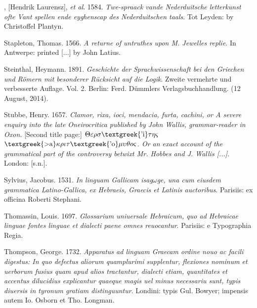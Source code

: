 \begin{styleStandard}
[Spieghel], [Hendrik Laurensz], \textit{et al}. 1584. \textit{Twe-spraack vande Nederduitsche letterkunst ofte Vant spellen ende eyghenscap des Nederduitschen taals}. Tot Leyden: by Christoffel Plantyn.
\end{styleStandard}

\begin{styleStandard}
Stapleton, Thomas. 1566. \textit{A returne of untruthes upon M. Jewelles replie}. In Antwerpe: printed [...] by John Latius.
\end{styleStandard}

\begin{styleStandard}
Steinthal, Heymann. 1891. \textit{Geschichte der Sprachwissenschaft bei den Griechen und Römern mit besonderer Rücksicht auf die Logik}. Zweite vermehrte und verbesserte Auflage. Vol. 2. Berlin: Ferd. Dümmlers Verlagsbuchhandlung. (12 August, 2014).
\end{styleStandard}

\begin{styleStandard}
Stubbe, Henry. 1657. \textit{Clamor, rixa, ioci, mendacia, furta, cachini, or A severe enquiry into the late Oneirocritica published by John Wallis, grammar-reader in Oxon. }[Second title page:]\textit{ $\Theta \varepsilon \rho \sigma \text{\textgreek{'i}}\tau \eta \varsigma $ $\text{\textgreek{>a}}\kappa \rho \iota \tau \text{\textgreek{'o}}\mu \upsilon \theta o\varsigma $. Or an exact account of the grammatical part of the controversy betwixt Mr. Hobbes and J. Wallis [...]}. London: [s.n.].
\end{styleStandard}

\begin{styleStandard}
Sylvius, Jacobus. 1531. \textit{In linguam Gallicam isag$\omega $ge, una cum eiusdem grammatica Latino-Gallica, ex Hebraeis, Graecis et Latinis auctoribus}. Parisiis: ex officina Roberti Stephani.
\end{styleStandard}

\begin{styleStandard}
Thomassin, Louis. 1697. \textit{Glossarium uniuersale Hebraicum, quo ad Hebraicae linguae fontes linguae et dialecti paene omnes reuocantur}. Parisiis: e Typographia Regia.
\end{styleStandard}

\begin{styleStandard}
Thompson, George. 1732. \textit{Apparatus ad linguam Graecam ordine nouo ac facili digestus: In quo defectus aliorum quamplurimi supplentur, flexiones nominum et uerborum fusius quam apud alios tractantur, dialecti etiam, quantitates et accentus dilucidius explicantur quaeque magis uel minus necessariu sunt, typis diuersis in tyronum gratiam distinguuntur}. Londini: typis Gul. Bowyer; impensis autem Io. Osborn et Tho. Longman.
\end{styleStandard}


